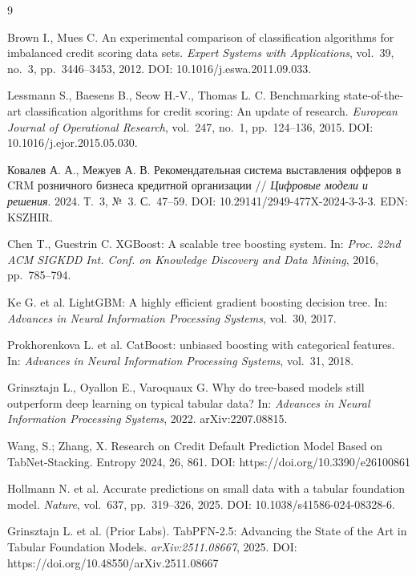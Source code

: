 \documentclass{misisarticle}
\begin{document}
\begin{thebibliography}{9}

 Brown I., Mues C. An experimental comparison of classification algorithms for imbalanced credit scoring data sets. \textit{Expert Systems with Applications}, vol.~39, no.~3, pp.~3446--3453, 2012. DOI: 10.1016/j.eswa.2011.09.033.

 Lessmann S., Baesens B., Seow H.-V., Thomas L. C. Benchmarking state-of-the-art classification algorithms for credit scoring: An update of research. \textit{European Journal of Operational Research}, vol.~247, no.~1, pp.~124--136, 2015. DOI: 10.1016/j.ejor.2015.05.030.

 Ковалев А. А., Межуев А. В. Рекомендательная система выставления офферов в CRM розничного бизнеса кредитной организации // \textit{Цифровые модели и решения}. 2024. Т.~3, №~3. С.~47--59. DOI: 10.29141/2949-477X-2024-3-3-3. EDN: KSZHIR.

 Chen T., Guestrin C. XGBoost: A scalable tree boosting system. In: \textit{Proc. 22nd ACM SIGKDD Int. Conf. on Knowledge Discovery and Data Mining}, 2016, pp.~785--794.

 Ke G. et al. LightGBM: A highly efficient gradient boosting decision tree. In: \textit{Advances in Neural Information Processing Systems}, vol.~30, 2017.

 Prokhorenkova L. et al. CatBoost: unbiased boosting with categorical features. In: \textit{Advances in Neural Information Processing Systems}, vol.~31, 2018.

 Grinsztajn L., Oyallon E., Varoquaux G. Why do tree-based models still outperform deep learning on typical tabular data? In: \textit{Advances in Neural Information Processing Systems}, 2022. arXiv:2207.08815.

 Wang, S.; Zhang, X. Research on Credit Default Prediction Model Based on TabNet-Stacking. Entropy 2024, 26, 861. DOI: https://doi.org/10.3390/e26100861

 Hollmann N. et al. Accurate predictions on small data with a tabular foundation model. \textit{Nature}, vol.~637, pp.~319--326, 2025. DOI: 10.1038/s41586-024-08328-6.

 Grinsztajn L. et al. (Prior Labs). TabPFN-2.5: Advancing the State of the Art in Tabular Foundation Models. \textit{arXiv:2511.08667}, 2025. DOI: https://doi.org/10.48550/arXiv.2511.08667


\end{thebibliography}
\end{document}
